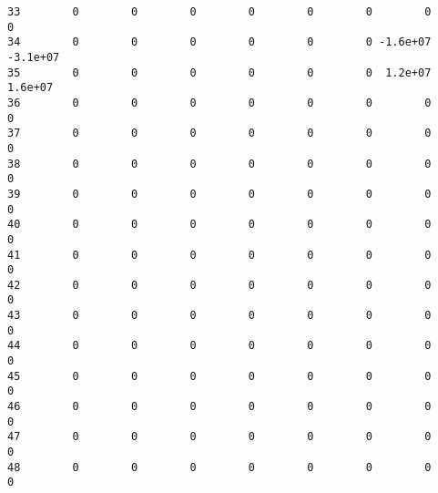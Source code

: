 \documentclass{article}
\begin{document}
\begin{verbatim}
33        0        0        0        0        0        0        0        0   
34        0        0        0        0        0        0 -1.6e+07 -3.1e+07   
35        0        0        0        0        0        0  1.2e+07  1.6e+07   
36        0        0        0        0        0        0        0        0   
37        0        0        0        0        0        0        0        0   
38        0        0        0        0        0        0        0        0   
39        0        0        0        0        0        0        0        0   
40        0        0        0        0        0        0        0        0   
41        0        0        0        0        0        0        0        0   
42        0        0        0        0        0        0        0        0   
43        0        0        0        0        0        0        0        0   
44        0        0        0        0        0        0        0        0   
45        0        0        0        0        0        0        0        0   
46        0        0        0        0        0        0        0        0   
47        0        0        0        0        0        0        0        0   
48        0        0        0        0        0        0        0        0   


\end{verbatim}
\end{document}
